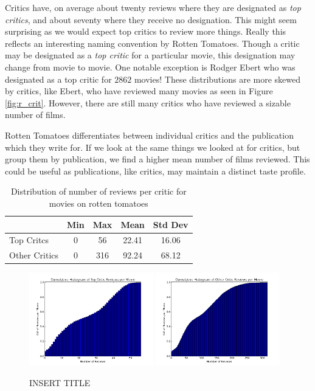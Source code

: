 \documentclass[12pt]{article}
\begin{document}
	Critics have, on average about twenty reviews where they are designated as \textit{top critics}, and about seventy where they receive no designation. This might seem surprising as we would expect top critics to review more things. Really this reflects an interesting naming convention by Rotten Tomatoes. Though a critic may be designated as a \textit{top critic} for a particular movie, this designation may change from movie to movie. One notable exception is Rodger Ebert who was designated as a top critic for $2862$ movies! These distributions are more skewed by critics, like Ebert, who have reviewed many movies as seen in Figure \ref{fig:r_crit}. However, there are still many critics who have reviewed a sizable number of films.

	Rotten Tomatoes differentiates between individual critics and the publication which they write for. If we look at the same things we looked at for critics, but group them by publication, we find a higher mean number of films reviewed. This could be useful as publications, like critics, may maintain a distinct taste profile.

	\begin{table}[H]
	 \centering
	 \caption{Distribution of number of reviews per critic for movies on rotten tomatoes}
	 \begin{tabular}{ l | c | c | c | c }
	 \hline
	 &  Min & Max & Mean & Std Dev  \\
	 \hline
	 Top Critcs & 0 & 56 & 22.41 & 16.06 \\
	 Other Critics & 0 & 316 & 92.24 & 68.12 \\
	 \hline
	 \end{tabular}
	 \end{table}

	\begin{figure}[H]
	    \centering
	    \includegraphics[width=0.48\textwidth]{plots/plot_r_mov_top.png}
	    \includegraphics[width=0.48\textwidth]{plots/plot_r_mov_oth.png}
	    \caption{INSERT TITLE}
	    \label{fig:r_mov} 
	\end{figure}
\end{document}
